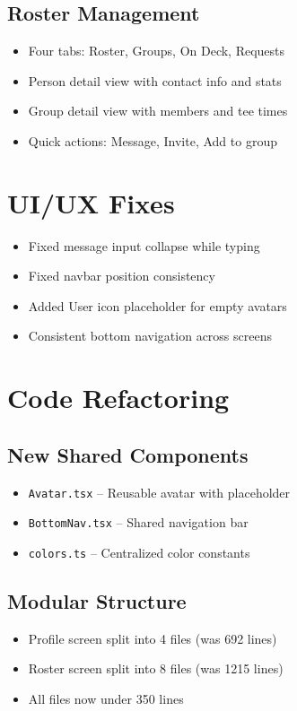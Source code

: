 \documentclass[11pt,a4paper]{article}
\begin{document}
\subsection{Roster Management}
\begin{itemize}[noitemsep]
    \item Four tabs: Roster, Groups, On Deck, Requests
    \item Person detail view with contact info and stats
    \item Group detail view with members and tee times
    \item Quick actions: Message, Invite, Add to group
\end{itemize}

\section{UI/UX Fixes}
\begin{itemize}[noitemsep]
    \item Fixed message input collapse while typing
    \item Fixed navbar position consistency
    \item Added User icon placeholder for empty avatars
    \item Consistent bottom navigation across screens
\end{itemize}

\section{Code Refactoring}

\subsection{New Shared Components}
\begin{itemize}[noitemsep]
    \item \texttt{Avatar.tsx} -- Reusable avatar with placeholder
    \item \texttt{BottomNav.tsx} -- Shared navigation bar
    \item \texttt{colors.ts} -- Centralized color constants
\end{itemize}

\subsection{Modular Structure}
\begin{itemize}[noitemsep]
    \item Profile screen split into 4 files (was 692 lines)
    \item Roster screen split into 8 files (was 1215 lines)
    \item All files now under 350 lines
\end{itemize}
\end{document}
